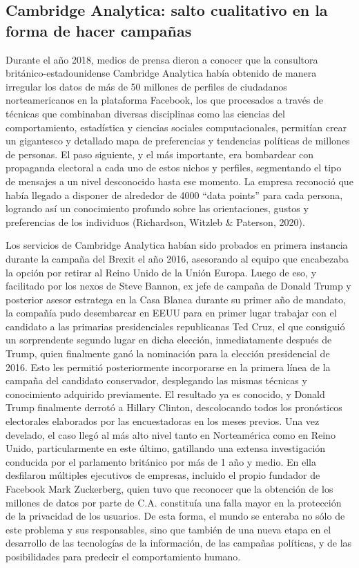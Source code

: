 \documentclass[
  10pt,
  letterpaper,
]{report}
\begin{document}
\hypertarget{cambridge-analytica-salto-cualitativo-en-la-forma-de-hacer-campauxf1as}{%
\subsection{Cambridge Analytica: salto cualitativo en la forma de hacer
campañas}\label{cambridge-analytica-salto-cualitativo-en-la-forma-de-hacer-campauxf1as}}

Durante el año 2018, medios de prensa dieron a conocer que la consultora
británico-estadounidense Cambridge Analytica había obtenido de manera
irregular los datos de más de 50 millones de perfiles de ciudadanos
norteamericanos en la plataforma Facebook, los que procesados a través
de técnicas que combinaban diversas disciplinas como las ciencias del
comportamiento, estadística y ciencias sociales computacionales,
permitían crear un gigantesco y detallado mapa de preferencias y
tendencias políticas de millones de personas. El paso siguiente, y el
más importante, era bombardear con propaganda electoral a cada uno de
estos nichos y perfiles, segmentando el tipo de mensajes a un nivel
desconocido hasta ese momento. La empresa reconoció que había llegado a
disponer de alrededor de 4000 ``data points'' para cada persona,
logrando así un conocimiento profundo sobre las orientaciones, gustos y
preferencias de los individuos (Richardson, Witzleb \& Paterson, 2020).

Los servicios de Cambridge Analytica habían sido probados en primera
instancia durante la campaña del Brexit el año 2016, asesorando al
equipo que encabezaba la opción por retirar al Reino Unido de la Unión
Europa. Luego de eso, y facilitado por los nexos de Steve Bannon, ex
jefe de campaña de Donald Trump y posterior asesor estratega en la Casa
Blanca durante su primer año de mandato, la compañía pudo desembarcar en
EEUU para en primer lugar trabajar con el candidato a las primarias
presidenciales republicanas Ted Cruz, el que consiguió un sorprendente
segundo lugar en dicha elección, inmediatamente después de Trump, quien
finalmente ganó la nominación para la elección presidencial de 2016.
Esto les permitió posteriormente incorporarse en la primera línea de la
campaña del candidato conservador, desplegando las mismas técnicas y
conocimiento adquirido previamente. El resultado ya es conocido, y
Donald Trump finalmente derrotó a Hillary Clinton, descolocando todos
los pronósticos electorales elaborados por las encuestadoras en los
meses previos. Una vez develado, el caso llegó al más alto nivel tanto
en Norteamérica como en Reino Unido, particularmente en este último,
gatillando una extensa investigación conducida por el parlamento
británico por más de 1 año y medio. En ella desfilaron múltiples
ejecutivos de empresas, incluido el propio fundador de Facebook Mark
Zuckerberg, quien tuvo que reconocer que la obtención de los millones de
datos por parte de C.A. constituía una falla mayor en la protección de
la privacidad de los usuarios. De esta forma, el mundo se enteraba no
sólo de este problema y sus responsables, sino que también de una nueva
etapa en el desarrollo de las tecnologías de la información, de las
campañas políticas, y de las posibilidades para predecir el
comportamiento humano.
\end{document}
